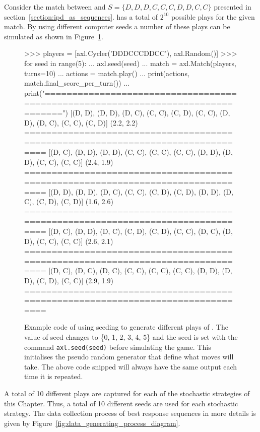 Consider the match between \Random and \(S = \{D, D, D, C, C, C, D, D, C, C\}\)
presented in section~\ref{section:ipd_as_sequences}. \Random has a total of
\(2^{10}\) possible plays for the given match. By using different computer seeds a number of these
plays can be simulated as shown in Figure~\ref{fig:random_apl_example}.

\begin{figure}[!htbp]
    \begin{usagepy}
>>> players = [axl.Cycler('DDDCCCDDCC'), axl.Random()]
>>> for seed in range(5):
...   axl.seed(seed)
...   match = axl.Match(players, turns=10)
...   actions = match.play()
...   print(actions, match.final_score_per_turn())
...   print("================================================================================")
[(D, D), (D, D), (D, C), (C, C), (C, D), (C, C), (D, D), (D, C), (C, C), (C, D)] (2.2, 2.2)
================================================================================
[(D, C), (D, D), (D, D), (C, C), (C, C), (C, C), (D, D), (D, D), (C, C), (C, C)] (2.4, 1.9)
================================================================================
[(D, D), (D, D), (D, C), (C, C), (C, D), (C, D), (D, D), (D, C), (C, D), (C, D)] (1.6, 2.6)
================================================================================
[(D, C), (D, D), (D, C), (C, D), (C, D), (C, C), (D, C), (D, D), (C, C), (C, C)] (2.6, 2.1)
================================================================================
[(D, C), (D, C), (D, C), (C, C), (C, C), (C, C), (D, D), (D, D), (C, D), (C, C)] (2.9, 1.9)
================================================================================

\end{usagepy}
\caption{Example code of using seeding to generate different plays of \Random.
The value of seed changes to \{0, 1, 2, 3, 4, 5\} and the seed is set with
the command \texttt{axl.seed(seed)} before simulating the game. This initialises the
pseudo random generator that define what moves \Random will take.
The above code snipped will always have the same output each time it is
repeated.}\label{fig:random_apl_example}
\end{figure}

A total of 10 different plays are captured for each of the stochastic strategies
of this Chapter. Thus, a total of 10 different seeds are used for each stochastic
strategy.
The data collection process of best response sequences in more details is given
by Figure~\ref{fig:data_generating_process_diagram}.

